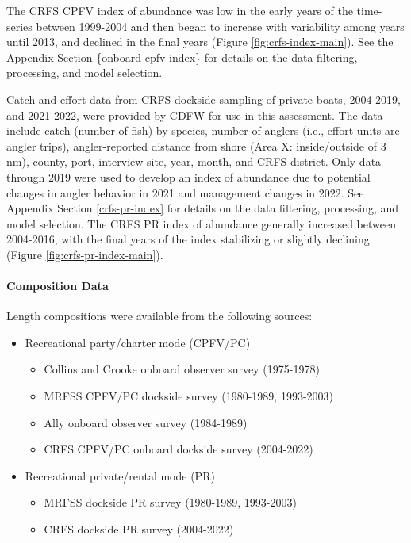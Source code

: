 \documentclass[11pt,
  english,
  letterpaper,
]{article}
\providecommand{\tightlist}{%
  \setlength{\itemsep}{0pt}\setlength{\parskip}{0pt}}
\providecommand{\tightlist}{%
  \setlength{\itemsep}{0pt}\setlength{\parskip}{0pt}}
\begin{document}
The CRFS CPFV index of abundance was low in the early years of the time-series between 1999-2004 and then began to increase with variability among years until 2013, and declined in the final years (Figure \ref{fig:crfs-index-main}). See the Appendix Section \{onboard-cpfv-index\} for details on the data filtering, processing, and model selection.

Catch and effort data from CRFS dockside sampling of private boats, 2004-2019, and 2021-2022, were provided by CDFW for use in this assessment. The data include catch (number of fish) by species, number of anglers (i.e., effort units are angler trips), angler-reported distance from shore (Area X: inside/outside of 3 nm), county, port, interview site, year, month, and CRFS district. Only data through 2019 were used to develop an index of abundance due to potential changes in angler behavior in 2021 and management changes in 2022. See Appendix Section \ref{crfs-pr-index} for details on the data filtering, processing, and model selection. The CRFS PR index of abundance generally increased between 2004-2016, with the final years of the index stabilizing or slightly declining (Figure \ref{fig:crfs-pr-index-main}).

\hypertarget{composition-data-1}{%
\paragraph{Composition Data}\label{composition-data-1}}

\hfill\break

Length compositions were available from the following sources:

\begin{itemize}
\item
  Recreational party/charter mode (CPFV/PC)

  \begin{itemize}
  \tightlist
  \item
    Collins and Crooke onboard observer survey (1975-1978)
  \item
    MRFSS CPFV/PC dockside survey (1980-1989, 1993-2003)
  \item
    Ally onboard observer survey (1984-1989)
  \item
    CRFS CPFV/PC onboard dockside survey (2004-2022)
  \end{itemize}
\item
  Recreational private/rental mode (PR)

  \begin{itemize}
  \tightlist
  \item
    MRFSS dockside PR survey (1980-1989, 1993-2003)
  \item
    CRFS dockside PR survey (2004-2022)
  \end{itemize}
\end{itemize}
\end{document}
